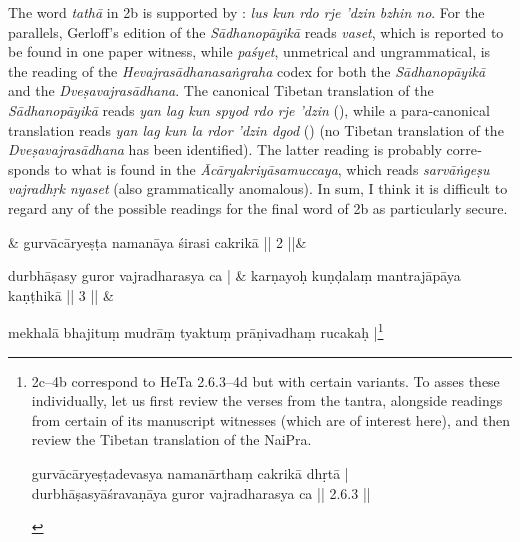 \documentclass[naipra.tex]{subfiles}
\begin{document}
\begin{sanskrit}
{\begin{english}
		The word \emph{tathā} in 2b is supported by \TIB : \emph{lus kun rdo rje 'dzin bzhin no}.
		For the parallels, Gerloff's edition of the \emph{Sādhanopāyikā} reads \emph{vaset}, which is reported to be found in one paper witness, while \emph{paśyet}, unmetrical and ungrammatical, is the reading of the \emph{Hevajrasādhanasaṅgraha} codex for both the \emph{Sādhanopāyikā} and the \emph{Dveṣavajrasādhana}.
		The canonical Tibetan translation of the \emph{Sādhanopāyikā} reads \emph{yan lag kun spyod rdo rje 'dzin} (\cite[vol.\ 1 135]{gerloff2020}), while a para-canonical translation reads \emph{yan lag kun la rdor 'dzin dgod} (\cite[vol.\ 2 152]{gerloff2020}) (no Tibetan translation of the \emph{Dveṣavajrasādhana} has been identified).
		The latter reading is probably corresponds to what is found in the \emph{Ācāryakriyāsamuccaya}, which reads \emph{sarvāṅgeṣu vajradhṛk nyaset} (also grammatically anomalous).
		In sum, I think it is difficult to regard any of the possible readings for the final word of 2b as particularly secure.
		\label{2bnote}
	\end{english}
} & 
gurvācāryeṣṭa namanāya śirasi cakrikā || 2 ||\&


\medskip\versequote
durbhāṣasy guror vajradharasya ca | &
karṇayoḥ kuṇḍalaṃ  mantrajāpāya kaṇṭhikā || 3 || \& 


\medskip\versequote 
mekhalā bhajituṃ mudrāṃ tyaktuṃ prāṇivadhaṃ rucakaḥ |\footnote{
	\begin{english}%
		2c–4b correspond to HeTa 2.6.3–4d but with certain variants.
		To asses these individually, let us first review the verses from the tantra, alongside readings from certain of its manuscript witnesses (which are of interest here), and then review the Tibetan translation of the NaiPra.

		\begin{prosequote}%
			gurvācāryeṣṭadevasya namanārthaṃ cakrikā dhṛtā |\\
			durbhāṣasyāśravaṇāya guror vajradharasya ca || 2.6.3 ||
			\medskip	


\end{prosequote}
\end{english}}
\end{sanskrit}
\end{document}
